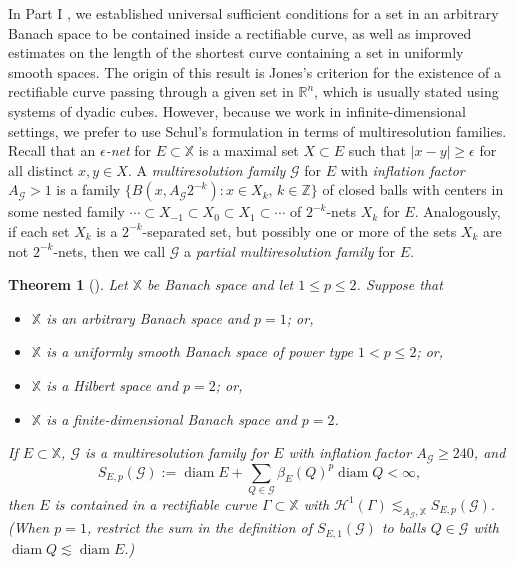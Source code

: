 \documentclass[12pt]{amsart}
\numberwithin{equation}{section}
\theoremstyle{plain}
\newtheorem{theorem}{Theorem}[section]
\theoremstyle{definition}
\def\RR{\mathbb{R}}
\def\ZZ{\mathbb{Z}}
\def\XX{{\mathbb{X}}}
\newcommand{\diam}{\mathop\mathrm{diam}\nolimits}
\newcommand{\Haus}{\mathcal{H}}
\numberwithin{figure}{section}
\begin{document}
In Part I \cite{Badger-McCurdy-1}, we established universal sufficient conditions for a set in an arbitrary Banach space to be contained inside a rectifiable curve, as well as improved estimates on the length of the shortest curve containing a set in uniformly smooth spaces. The origin of this result is Jones's criterion \cite{Jones-TST} for the existence of a rectifiable curve passing through a given set in $\RR^n$, which is usually stated using systems of dyadic cubes. However, because we work in infinite-dimensional settings, we prefer to use Schul's formulation \cite{Schul-Hilbert} in terms of multiresolution families. Recall that an \emph{$\epsilon$-net} for $E\subset\XX$ is a maximal set $X\subset E$ such that $|x-y|\geq \epsilon$ for all distinct $x,y\in X$. A \emph{multiresolution family} $\mathscr{G}$ for $E$ with \emph{inflation factor} $A_\mathscr{G}>1$ is a family $\{B(x,A_\mathscr{G} 2^{-k}):x\in X_k,\,k\in\ZZ\}$ of closed balls with centers in some nested family $\cdots\subset X_{-1}\subset X_0\subset X_{1}\subset\cdots$ of $2^{-k}$-nets $X_k$ for $E$. Analogously, if each set $X_k$ is a $2^{-k}$-separated set, but possibly one or more of the sets $X_k$ are not $2^{-k}$-nets, then we call $\mathscr{G}$ a \emph{partial multiresolution family} for $E$.

\begin{theorem}[{\cite{Jones-TST,Schul-Hilbert,Badger-McCurdy-1}}] \label{t:suff} Let $\XX$ be Banach space and let $1\leq p\leq 2$. Suppose that \begin{itemize}
\item[(i)] $\XX$ is an arbitrary Banach space and $p=1$; or,
\item[(ii)] $\XX$ is a uniformly smooth Banach space of power type $1<p\leq 2$; or,
\item[(iii)] $\XX$ is a Hilbert space and $p=2$; or,
\item[(iv)] $\XX$ is a finite-dimensional Banach space and $p=2$.
\end{itemize} If $E\subset\XX$, $\mathscr{G}$ is a multiresolution family for $E$ with inflation factor $A_\mathscr{G}\geq 240$, and \begin{equation}S_{E,p}(\mathscr{G}):=\diam E+\sum_{Q\in\mathscr{G}} \beta_E(Q)^p\diam Q<\infty,\end{equation} then $E$ is contained in a rectifiable curve $\Gamma\subset\XX$ with $\Haus^1(\Gamma)\lesssim_{A_\mathscr{G},\XX} S_{E,p}(\mathscr{G})$. (When $p=1$, restrict the sum in the definition of $S_{E,1}(\mathscr{G})$ to balls $Q\in\mathscr{G}$ with $\diam Q\lesssim \diam E$.)
\end{theorem}
\end{document}
